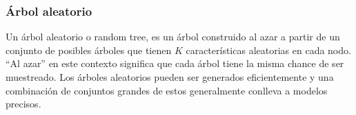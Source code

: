 \subsubsection{Árbol aleatorio}

	Un árbol aleatorio o random tree, es un árbol construido al azar a
        partir de un conjunto de posibles árboles que tienen $K$
        características aleatorias en cada nodo. ``Al azar'' en este contexto
        significa que cada árbol tiene la misma chance de ser muestreado. Los
        árboles aleatorios pueden ser generados eficientemente y una
        combinación de conjuntos grandes de estos generalmente conlleva a
        modelos precisos.


